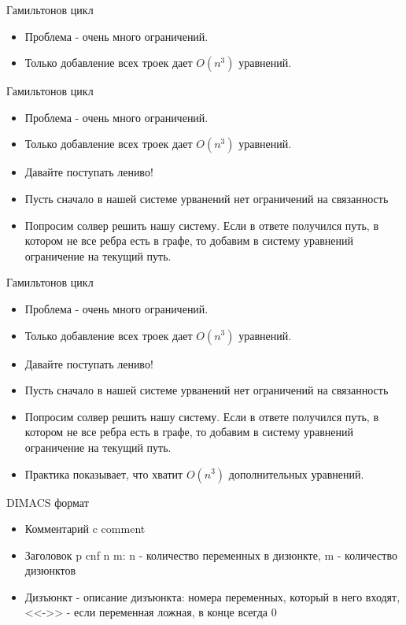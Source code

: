 \documentclass{beamer}
\begin{document}
\begin{frame}{Гамильтонов цикл}
\begin{itemize}
\item Проблема - очень много ограничений.
\item Только добавление всех троек дает $O(n^3)$ уравнений.
\end{itemize}
\end{frame}

\begin{frame}{Гамильтонов цикл}
\begin{itemize}
\item Проблема - очень много ограничений.
\item Только добавление всех троек дает $O(n^3)$ уравнений.
\item Давайте поступать лениво!
\item Пусть сначало в нашей системе урванений нет ограничений на связанность
\item Попросим солвер решить нашу систему. Если в ответе получился путь, в котором не все ребра есть в графе, то добавим в
систему уравнений ограничение на текущий путь.
\end{itemize}
\end{frame}

\begin{frame}{Гамильтонов цикл}
\begin{itemize}
\item Проблема - очень много ограничений.
\item Только добавление всех троек дает $O(n^3)$ уравнений.
\item Давайте поступать лениво!
\item Пусть сначало в нашей системе урванений нет ограничений на связанность
\item Попросим солвер решить нашу систему. Если в ответе получился путь, в котором не все ребра есть в графе, то добавим в
систему уравнений ограничение на текущий путь.
\item Практика показывает, что хватит $O(n^3)$ дополнительных уравнений.
\end{itemize}
\end{frame}

\begin{frame}{DIMACS формат}
\begin{itemize}
\item Комментарий c comment
\item Заголовок p cnf n m: n - количество переменных в дизюнкте, m - количество дизюнктов
\item Дизъюнкт - описание дизъюнкта: номера переменных, который в него входят, <<->> - если переменная ложная, в конце всегда 0
\end{itemize}
\end{frame}
\end{document}
